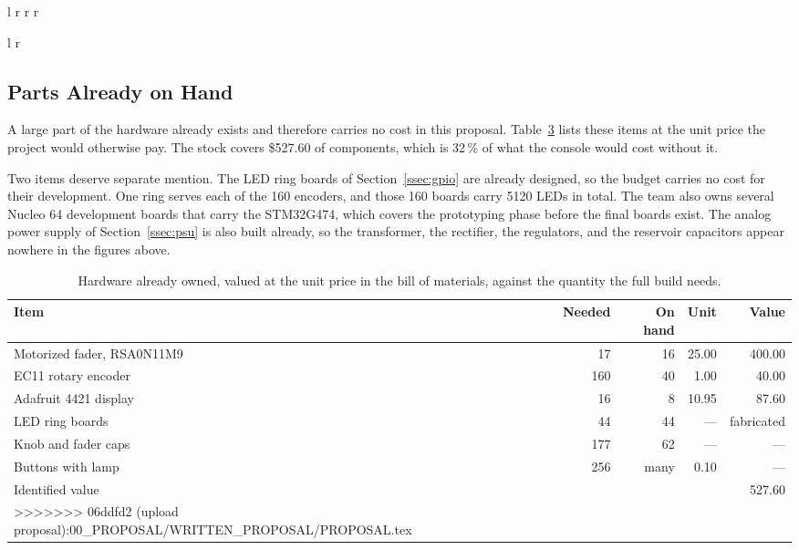 \documentclass[11pt, letterpaper,titlepage]{article}
\begin{document}
\begin{table}[H]
\begin{tabular}{l r r r}
\begin{table}[H]
\begin{tabular}{l r}
\subsection*{Parts Already on Hand}
\label{ssec:budget-onhand}

A large part of the hardware already exists and therefore carries no cost in
this proposal. Table~\ref{tab:budget-onhand} lists these items at the unit price
the project would otherwise pay. The stock covers \$527.60 of components, which
is 32\,\% of what the console would cost without it.

Two items deserve separate mention. The LED ring boards of Section~\ref{ssec:gpio} are
already designed, so the budget carries no cost for their development. One ring
serves each of the 160 encoders, and those 160 boards carry 5120 LEDs in total. The team also owns several Nucleo 64 development
boards that carry the STM32G474, which covers the prototyping phase before the
final boards exist. The analog power supply of Section~\ref{ssec:psu} is also
built already, so the transformer, the rectifier, the regulators, and the
reservoir capacitors appear nowhere in the figures above.

\begin{table}[h]
\centering
\caption{Hardware already owned, valued at the unit price in the bill of
materials, against the quantity the full build needs.}

\vspace{0.5cm}

\label{tab:budget-onhand}
\begin{tabular}{l r r r r}
\toprule
\textbf{Item} & \textbf{Needed} & \textbf{On hand} & \textbf{Unit} & \textbf{Value} \\
\midrule
Motorized fader, RSA0N11M9 & 17  & 16 & 25.00 & 400.00 \\
EC11 rotary encoder        & 160 & 40 & 1.00  & 40.00  \\
Adafruit 4421 display      & 16  & 8  & 10.95 & 87.60  \\
LED ring boards            & 44  & 44 & ---   & fabricated \\
Knob and fader caps        & 177 & 62 & ---   & ---    \\
Buttons with lamp          & 256 & many & 0.10 & ---   \\
\midrule
Identified value           &     &    &       & 527.60 \\
>>>>>>> 06ddfd2 (upload proposal):00_PROPOSAL/WRITTEN_PROPOSAL/PROPOSAL.tex
\bottomrule
\end{tabular}
\end{table}


\end{tabular}
\end{table}
\end{tabular}
\end{table}
\end{document}
